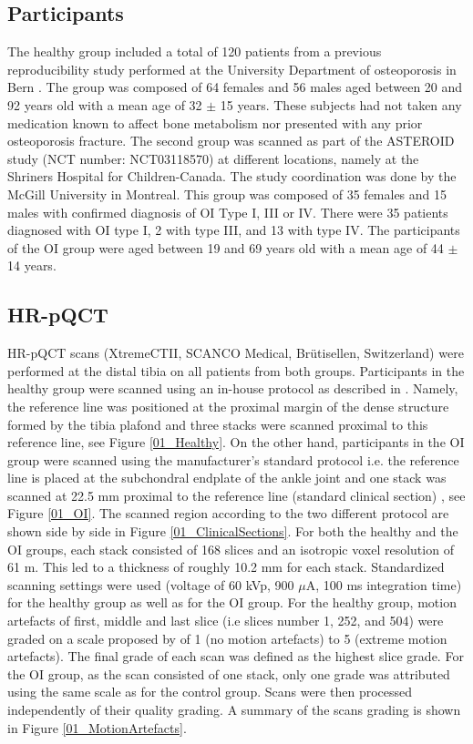 \documentclass[a4paper,fleqn]{DC_ArtStyle}
\begin{document}
\subsection{Participants}
The healthy group included a total of 120 patients from a previous reproducibility study performed at the University Department of osteoporosis in Bern \cite{Schenk2020}. The group was composed of 64 females and 56 males aged between 20 and 92 years old with a mean age of 32 $\pm$ 15 years. These subjects had not taken any medication known to affect bone metabolism nor presented with any prior osteoporosis fracture. The second group was scanned as part of the ASTEROID study (NCT number: NCT03118570) at different locations, namely at the Shriners Hospital for Children-Canada. The study coordination was done by the McGill University in Montreal. This group was composed of 35 females and 15 males with confirmed diagnosis of OI Type I, III or IV. There were 35 patients diagnosed with OI type I, 2 with type III, and 13 with type IV. The participants of the OI group were aged between 19 and 69 years old with a mean age of 44 $\pm$ 14 years. 

\subsection{HR-pQCT}
HR-pQCT scans (XtremeCTII, SCANCO Medical, Br\"{u}tisellen,
Switzerland) were performed at the distal tibia on all patients from both groups. Participants in the healthy group were scanned using an in-house protocol as described in \cite{Schenk2020}. Namely, the reference line was positioned at the proximal margin of the dense structure formed by the tibia plafond and three stacks were scanned proximal to this reference line, see Figure \ref{01_Healthy}. On the other hand, participants in the OI group were scanned using the manufacturer's standard protocol i.e. the reference line is placed at the subchondral endplate of the ankle joint and one stack was scanned at 22.5 mm proximal to the reference line (standard clinical section) \cite{Whittier2020}, see Figure \ref{01_OI}. The scanned region according to the two different protocol are shown side by side in Figure \ref{01_ClinicalSections}. For both the healthy and the OI groups, each stack consisted of 168 slices and an isotropic voxel resolution of 61 \si{\micro}m. This led to a thickness of roughly 10.2 mm for each stack. Standardized scanning settings were used (voltage of 60 kVp, 900 $\mu$A, 100 ms integration time) for the healthy group as well as for the OI group. For the healthy group, motion artefacts of first, middle and last slice (i.e slices number 1, 252, and 504) were graded on a scale proposed by \citeauthor{Pialat2012} \cite{Pialat2012} of 1 (no motion artefacts) to 5 (extreme motion artefacts). The final grade of each scan was defined as the highest slice grade. For the OI group, as the scan consisted of one stack, only one grade was attributed using the same scale as for the control group. Scans were then processed independently of their quality grading. A summary of the scans grading is shown in Figure \ref{01_MotionArtefacts}.
\end{document}
